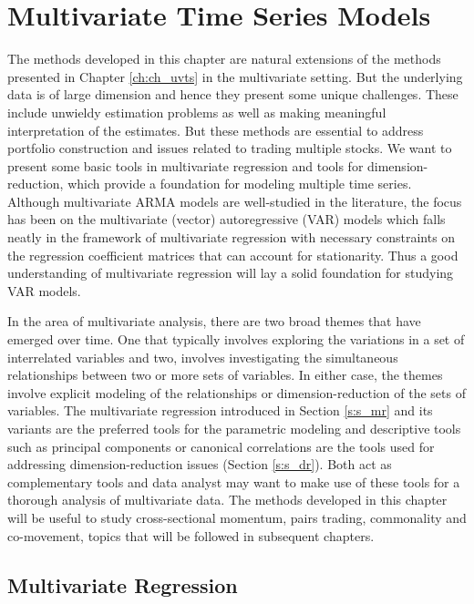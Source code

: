 
\chapter{Multivariate Time Series Models \label{ch:ch_mvts}}

The methods developed in this chapter are natural extensions of the methods presented in Chapter \ref{ch:ch_uvts} in the multivariate setting. But the underlying data is of large dimension and hence they present some unique challenges. These include unwieldy estimation problems as well as making meaningful interpretation of the estimates. But these methods are essential to address portfolio construction and issues related to trading multiple stocks. We want to present some basic tools in multivariate regression and tools for dimension-reduction, which provide a foundation for modeling multiple time series. Although multivariate ARMA models are well-studied in the literature, the focus has been on the multivariate (vector) autoregressive (VAR) models which falls neatly in the framework of multivariate regression with necessary constraints on the regression coefficient matrices that can account for stationarity. Thus a good understanding of multivariate regression will lay a solid foundation for studying VAR models.


In the area of multivariate analysis, there are two broad themes that have emerged over time. One that typically involves exploring the variations in a set of interrelated variables and two, involves investigating the simultaneous relationships between two or more sets of variables. In either case, the themes involve explicit modeling of the relationships or dimension-reduction of the sets of variables. The multivariate regression introduced in Section \ref{s:s_mr} and its variants are the preferred tools for the parametric modeling and descriptive tools such as principal components or canonical correlations are the tools used for addressing dimension-reduction issues (Section \ref{s:s_dr}). Both act as complementary tools and data analyst may want to make use of these tools for a thorough analysis of multivariate data. The methods developed in this chapter will be useful to study cross-sectional momentum, pairs trading, commonality and co-movement, topics that will be followed in subsequent chapters.



\section{Multivariate Regression \label{s:s_mr}} 


